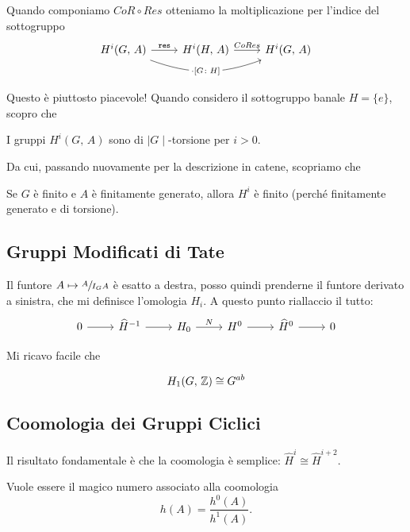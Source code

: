 \documentclass[a4paper]{article}
\begin{document}
	\begin{theorem}
		Quando componiamo $ CoR \circ Res $ otteniamo la moltiplicazione per l'indice del sottogruppo
		\[ \begin{tikzcd}
		H^i(G, \, A) \rar["\Res"] \arrow["\cdot {\left[G \colon H \right]}" description, bend right = 20]{rr} & H^i(H, \, A)\rar["CoRes"] & H^i(G, \, A)
		\end{tikzcd} \]
	\end{theorem}

	Questo è piuttosto piacevole! Quando considero il sottogruppo banale $ H = \{ e \} $, scopro che
	
	\begin{theorem}
		I gruppi $ H^i(G, \, A) $ sono di $ \mid G \mid  $-torsione per $ i > 0. $
	\end{theorem}

	Da cui, passando nuovamente per la descrizione in catene, scopriamo che
	\begin{theorem}
		Se $ G $ è finito e $ A $ è finitamente generato, allora $ H^i $ è finito (perché finitamente generato e di torsione).
	\end{theorem}

	\subsection{Gruppi Modificati di Tate}
	Il funtore $ A \mapsto \sfrac{A}{I_GA} $  è esatto a destra, posso quindi prenderne il funtore derivato a sinistra, che mi definisce l'omologia $ H_i. $ A questo punto riallaccio il tutto:
	\[ \begin{tikzcd}
	0 \rar &  \widehat{H}^{-1} \rar & H_0 \rar["N"] & H^0 \rar & \widehat{H}^0 \rar & 0
	\end{tikzcd} \]
	
	Mi ricavo facile che
	\begin{theorem}
		\[ H_1(G, \, \mathbb{Z}) \cong G^{ab} \]
	\end{theorem}

	\subsection{Coomologia dei Gruppi Ciclici}
	Il risultato fondamentale è che la coomologia è semplice: $ \widehat{H}^i \cong \widehat{H}^{i+2} $.
	
	\begin{definition}
		Vuole essere il magico numero associato alla coomologia
		\[ h(A) = \frac{h^0(A)}{h^1(A)}. \]
	\end{definition}	
\end{document}
